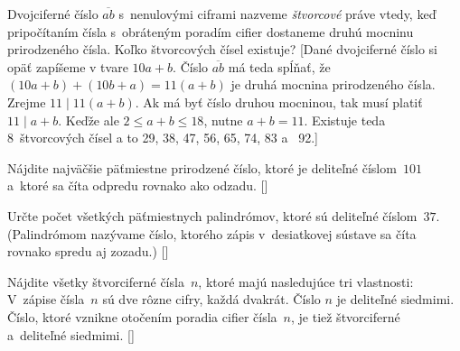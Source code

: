 {Dvojciferné číslo $\overline{ab}$ s~nenulovými ciframi nazveme \emph{štvorcové} práve vtedy, keď pripočítaním čísla s~obráteným poradím cifier dostaneme druhú mocninu prirodzeného
čísla. Koľko štvorcových čísel existuje? [Dané dvojciferné číslo si opäť zapíšeme v tvare $10a+b$. Číslo $\overline{ab}$ má teda spĺňať, že $(10a+b)+{(10b+a)}=11(a+b)$ je druhá mocnina prirodzeného čísla. Zrejme $11\mid 11(a+b)$. Ak má byť číslo druhou mocninou, tak musí platiť $11\mid a+b$. Keďže ale $2\leq a+b\leq 18$, nutne $a+b=11$. Existuje teda 8~štvorcových čísel a to 29, 38, 47, 56, 65, 74, 83 a ~92.]

\D
Nájdite najväčšie päťmiestne prirodzené číslo, ktoré je deliteľné číslom~$101$ a~ktoré sa číta odpredu rovnako ako odzadu.
[]

Určte počet všetkých päťmiestnych palindrómov, ktoré sú deliteľné číslom~$37$. (Palindrómom nazývame číslo,
ktorého zápis v~desiatkovej sústave sa číta rovnako spredu aj zozadu.)
[]

Nájdite všetky štvorciferné čísla~$n$, ktoré majú nasledujúce tri vlastnosti:
V~zápise čísla~$n$ sú dve rôzne cifry, každá dvakrát.
Číslo $n$ je deliteľné siedmimi.
Číslo, ktoré vznikne otočením poradia cifier čísla~$n$, je tiež štvorciferné
a~deliteľné siedmimi.
[]


}

